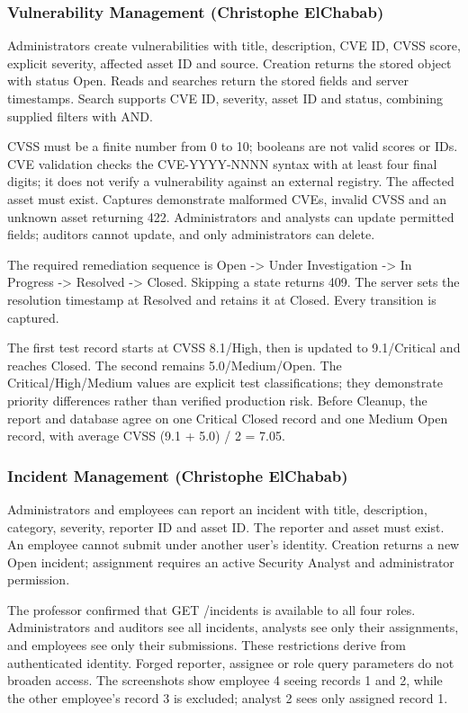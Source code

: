 \subsubsection{Vulnerability Management (Christophe ElChabab)}

Administrators create vulnerabilities with title, description, CVE ID, CVSS score, explicit severity, affected asset ID and source. Creation returns the stored object with status Open. Reads and searches return the stored fields and server timestamps. Search supports CVE ID, severity, asset ID and status, combining supplied filters with AND.

CVSS must be a finite number from 0 to 10; booleans are not valid scores or IDs. CVE validation checks the CVE-YYYY-NNNN syntax with at least four final digits; it does not verify a vulnerability against an external registry. The affected asset must exist. Captures demonstrate malformed CVEs, invalid CVSS and an unknown asset returning 422. Administrators and analysts can update permitted fields; auditors cannot update, and only administrators can delete.

The required remediation sequence is Open -> Under Investigation -> In Progress -> Resolved -> Closed. Skipping a state returns 409. The server sets the resolution timestamp at Resolved and retains it at Closed. Every transition is captured.

The first test record starts at CVSS 8.1/High, then is updated to 9.1/Critical and reaches Closed. The second remains 5.0/Medium/Open. The Critical/High/Medium values are explicit test classifications; they demonstrate priority differences rather than verified production risk. Before Cleanup, the report and database agree on one Critical Closed record and one Medium Open record, with average CVSS (9.1 + 5.0) / 2 = 7.05.

\subsubsection{Incident Management (Christophe ElChabab)}

Administrators and employees can report an incident with title, description, category, severity, reporter ID and asset ID. The reporter and asset must exist. An employee cannot submit under another user's identity. Creation returns a new Open incident; assignment requires an active Security Analyst and administrator permission.

The professor confirmed that GET /incidents is available to all four roles. Administrators and auditors see all incidents, analysts see only their assignments, and employees see only their submissions. These restrictions derive from authenticated identity. Forged reporter, assignee or role query parameters do not broaden access. The screenshots show employee 4 seeing records 1 and 2, while the other employee's record 3 is excluded; analyst 2 sees only assigned record 1.

